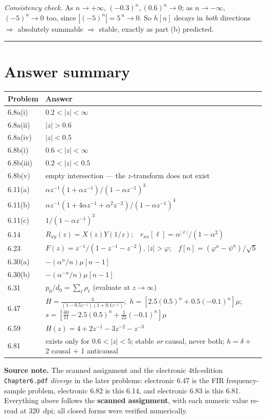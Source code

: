 \documentclass[11pt,letterpaper]{article}
\begin{document}
\emph{Consistency check.} As $n\to+\infty$, $(-0.3)^n,(0.6)^n\to0$; as $n\to-\infty$, $(-5)^n\to0$
too, since $|(-5)^n|=5^{\,n}\to0$. So $h[n]$ decays in \emph{both} directions $\Rightarrow$
absolutely summable $\Rightarrow$ stable, exactly as part (b) predicted.

\vspace{2ex}\noindent\rule{\linewidth}{1pt}
\section{Answer summary}

\begin{tabularx}{\linewidth}{@{}lX@{}}
\toprule
\textbf{Problem} & \textbf{Answer} \\
\midrule
6.8a(i)  & $0.2<|z|<\infty$ \\
6.8a(ii) & $|z|>0.6$ \\
6.8a(iv) & $|z|<0.5$ \\
6.8b(i)  & $0.6<|z|<\infty$ \\
6.8b(iii)& $0.2<|z|<0.5$ \\
6.8b(v)  & empty intersection --- the $z$-transform does not exist \\
6.11(a)  & $\alpha z^{-1}(1+\alpha z^{-1})/(1-\alpha z^{-1})^3$ \\
6.11(b)  & $\alpha z^{-1}(1+4\alpha z^{-1}+\alpha^2z^{-2})/(1-\alpha z^{-1})^4$ \\
6.11(c)  & $1/(1-\alpha z^{-1})^3$ \\
6.14     & $R_{xy}(z)=X(z)Y(1/z)$;\ \ $r_{xx}[\ell]=\alpha^{|\ell|}/(1-\alpha^2)$ \\
6.23     & $F(z)=z^{-1}/(1-z^{-1}-z^{-2})$, $|z|>\varphi$;\ \ $f[n]=(\varphi^n-\psi^n)/\sqrt5$ \\
6.30(a)  & $-(\alpha^n/n)\mu[n-1]$ \\
6.30(b)  & $-(\alpha^{-n}/n)\mu[n-1]$ \\
6.31     & $p_0/d_0=\sum_\ell\rho_\ell$ (evaluate at $z\to\infty$) \\
6.47     & $H=\frac{3}{(1-0.5z^{-1})(1+0.1z^{-1})}$;\ $h=[2.5(0.5)^n+0.5(-0.1)^n]\mu$;\ $s=[\frac{60}{11}-2.5(0.5)^n+\frac1{22}(-0.1)^n]\mu$ \\
6.59     & $H(z)=4+2z^{-1}-3z^{-2}-z^{-3}$ \\
6.81     & exists only for $0.6<|z|<5$; stable \emph{or} causal, never both; $h=\delta+$ 2 causal $+$ 1 anticausal \\
\bottomrule
\end{tabularx}

\vspace{1ex}
\begin{rules}
\textbf{Source note.} The scanned assignment and the electronic 4th-edition \texttt{Chapter6.pdf}
\emph{diverge} in the later problems: electronic 6.47 is the FIR frequency-sample problem,
electronic 6.82 is this 6.14, and electronic 6.83 is this 6.81. Everything above follows the
\textbf{scanned assignment}, with each numeric value re-read at 320~dpi; all closed forms were
verified numerically.
\end{rules}
\end{document}
